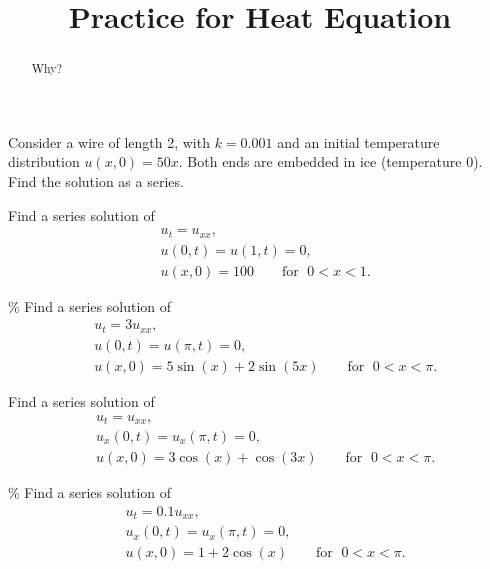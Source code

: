 \documentclass{ximera}
\title{Practice for Heat Equation}
\begin{document}
\begin{abstract}
Why?
\end{abstract}
\maketitle

\begin{exercise}
    Consider a wire of length 2, with $k=0.001$ and an initial temperature distribution $u(x,0) = 50 x$.  Both ends are embedded in ice (temperature 0).  Find the solution as a series.
\end{exercise}

\begin{exercise}
    Find a series solution of
    \begin{align*}
        & u_t =  u_{xx} , \\
        & u(0,t) = u(1,t) = 0 , \\
        & u(x,0) = 100 \qquad \text{for } \; 0 < x < 1 .
    \end{align*}
\end{exercise}

\begin{exercise}\%
    Find a series solution of
    \begin{align*}
        & u_t =  3 u_{xx} , \\
        & u(0,t) = u(\pi,t) = 0 , \\
        & u(x,0) = 5\sin (x) + 2\sin (5x) \qquad \text{for } \; 0 < x < \pi .
    \end{align*}
\end{exercise}

\begin{exercise}
    Find a series solution of
    \begin{align*}
        & u_t =  u_{xx} , \\
        & u_x(0,t) = u_x(\pi,t) = 0 , \\
        & u(x,0) = 3\cos (x) + \cos (3x) \qquad \text{for } \; 0 < x < \pi .
    \end{align*}
\end{exercise}

\begin{exercise}\%
    Find a series solution of
    \begin{align*}
        & u_t =  0.1 u_{xx} , \\
        & u_x(0,t) = u_x(\pi,t) = 0 , \\
        & u(x,0) = 1 + 2\cos (x) \qquad \text{for } \; 0 < x < \pi .
    \end{align*}
\end{exercise}
\end{document}
